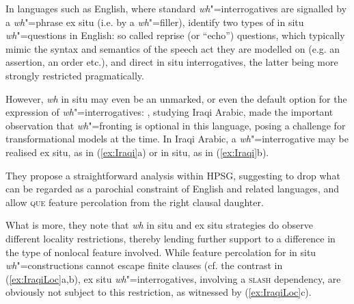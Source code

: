 \documentclass[output=paper
                ,modfonts
                ,nonflat
	        ,collection
	        ,collectionchapter
	        ,collectiontoclongg
 	        ,biblatex
                ,babelshorthands
                ,newtxmath
                ,draftmode
                ,colorlinks, citecolor=brown
]{./langsci/langscibook}
\begin{document}
{In languages such as English, where standard \emph{wh}"=interrogatives
are signalled by a \emph{wh}"=phrase ex situ (i.e. by a
\emph{wh}"=filler), \citet{Ginzburg:Sag:01} identify two types of in
situ \emph{wh}"=questions in English: so called reprise (or ``echo'')
questions, which typically mimic the syntax and semantics of the
speech act they are modelled on (e.g. an assertion, an order etc.),
and direct in situ interrogatives, the latter being more strongly
restricted
pragmatically. %

However, \emph{wh} in situ may even be an unmarked, or even the default
option for the expression of \emph{wh}"=interrogatives:
\citet{Johnson:Lappin:97}, studying Iraqi Arabic, made the important
observation that \emph{wh}"=fronting is optional in this language,
posing a challenge for transformational models at the time.  In Iraqi
Arabic, a \emph{wh}"=interrogative may be realised ex situ, as in
(\ref{ex:Iraqi}a) or in situ, as in (\ref{ex:Iraqi}b).

\begin{exe}
  \ex \label{ex:Iraqi}
  \begin{xlist}
    
  \end{xlist}

\end{exe}

\noindent
They propose a straightforward analysis within HPSG, suggesting to
drop what can be regarded as a parochial constraint of English and
related languages, and allow \textsc{que} feature percolation from the
right clausal daughter.
 
What is more, they note that \emph{wh} in situ and ex situ strategies
do observe different locality restrictions, thereby lending further
support to a difference in the type of nonlocal feature
involved. While feature percolation for in situ
\emph{wh}"=constructions cannot escape finite clauses (cf. the
contrast in (\ref{ex:IraqiLoc}a,b), ex situ \emph{wh}"=interrogatives,
involving a \textsc{slash} dependency, are obviously not subject to
this restriction, as witnessed by (\ref{ex:IraqiLoc}c).

}
\end{document}
